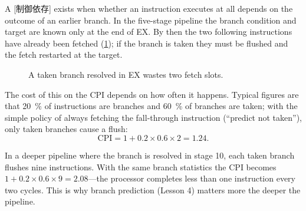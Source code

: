 \documentclass[../main.tex]{subfiles}
\begin{document}
A [制御依存] exists when whether an instruction
executes at all depends on the outcome of an earlier branch.  In the five-stage pipeline the branch
condition and target are known only at the end of EX.  By then the two
following instructions have already been fetched (\cref{fig:flush}); if the
branch is taken they must be flushed and the fetch restarted at the target.

\begin{figure}[htbp]
  \centering
  
  \caption{A taken branch resolved in EX wastes two fetch slots.}
  \label{fig:flush}
\end{figure}

The cost of this on the CPI depends on how often it
happens.  Typical
figures are that \SI{20}{\percent} of instructions are
branches and \SI{60}{\percent} of branches are taken; with the simple
policy of always fetching the fall-through instruction (\enquote{predict
not taken}), only taken branches cause a flush:
\begin{equation}
  \text{CPI} = 1 + 0.2 \times 0.6 \times 2 = 1.24 .
  \label{eq:branch-cpi}
\end{equation}

\begin{example}
  In a deeper pipeline where the branch is resolved in stage 10, each taken
  branch flushes nine instructions.  With the same branch statistics the
  CPI becomes $1 + 0.2\times 0.6\times 9 = 2.08$---the processor completes
  less than one instruction every two cycles.  This is why branch prediction
  (Lesson 4) matters more the deeper the pipeline.
\end{example}

\end{document}
